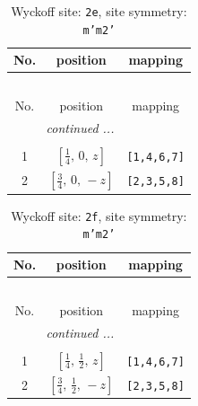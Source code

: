 \documentclass[fleqn,8pt]{jsarticle}
\begin{document}
\begin{longtable}{ccc}
\caption{Wyckoff site: {\tt 2e}, site symmetry: {\tt m'm2'}}
 \\
 \hline \hline
No. & position & mapping \\ \hline \endfirsthead

\multicolumn{2}{l}{\tablename\ \thetable{}} \\
 \hline \hline
No. & position & mapping \\ \hline \endhead

 \hline \hline
\multicolumn{2}{r}{\footnotesize\it continued ...} \\ \endfoot

 \hline \hline
\multicolumn{2}{r}{} \\ \endlastfoot

1 & $\left[ \frac{1}{4},\, 0,\, z \right]$ & {\tt [1,4,6,7]} \\ \hline
2 & $\left[ \frac{3}{4},\, 0,\, - z \right]$ & {\tt [2,3,5,8]} \\
\end{longtable}
\renewcommand{\arraystretch}{1.2}
\begin{longtable}{ccc}
\caption{Wyckoff site: {\tt 2f}, site symmetry: {\tt m'm2'}}
 \\
 \hline \hline
No. & position & mapping \\ \hline \endfirsthead

\multicolumn{2}{l}{\tablename\ \thetable{}} \\
 \hline \hline
No. & position & mapping \\ \hline \endhead

 \hline \hline
\multicolumn{2}{r}{\footnotesize\it continued ...} \\ \endfoot

 \hline \hline
\multicolumn{2}{r}{} \\ \endlastfoot

1 & $\left[ \frac{1}{4},\, \frac{1}{2},\, z \right]$ & {\tt [1,4,6,7]} \\ \hline
2 & $\left[ \frac{3}{4},\, \frac{1}{2},\, - z \right]$ & {\tt [2,3,5,8]} \\
\end{longtable}
\renewcommand{\arraystretch}{1.2}
\end{document}
